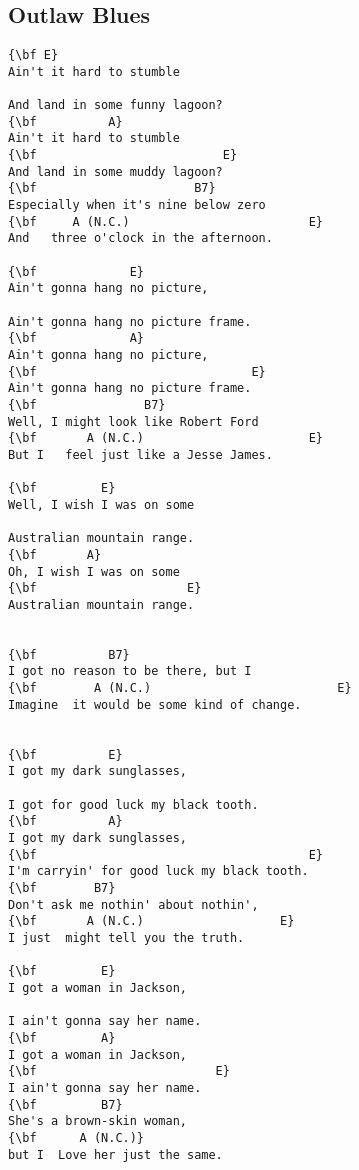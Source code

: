 \documentclass[a4paper]{article}
\begin{document}
\subsection{Outlaw Blues} %
\label{sub:Outlaw Blues}
\begin{multicols}{2}
\begin{Verbatim}[commandchars=\\\{\}]
{\bf E}
Ain't it hard to stumble

And land in some funny lagoon?
{\bf          A}
Ain't it hard to stumble
{\bf                          E}
And land in some muddy lagoon?
{\bf                      B7}
Especially when it's nine below zero
{\bf     A (N.C.)                         E}
And   three o'clock in the afternoon.

{\bf             E}
Ain't gonna hang no picture,

Ain't gonna hang no picture frame.
{\bf             A}
Ain't gonna hang no picture,
{\bf                              E}
Ain't gonna hang no picture frame.
{\bf               B7}
Well, I might look like Robert Ford
{\bf       A (N.C.)                       E}
But I   feel just like a Jesse James.

{\bf         E}
Well, I wish I was on some

Australian mountain range.
{\bf       A}
Oh, I wish I was on some
{\bf                     E}
Australian mountain range.


{\bf          B7}
I got no reason to be there, but I
{\bf        A (N.C.)                          E}
Imagine  it would be some kind of change.


{\bf          E}
I got my dark sunglasses,

I got for good luck my black tooth.
{\bf          A}
I got my dark sunglasses,
{\bf                                      E}
I'm carryin' for good luck my black tooth.
{\bf        B7}
Don't ask me nothin' about nothin',
{\bf       A (N.C.)                   E}
I just  might tell you the truth.

{\bf         E}
I got a woman in Jackson,

I ain't gonna say her name.
{\bf         A}
I got a woman in Jackson,
{\bf                         E}
I ain't gonna say her name.
{\bf         B7}
She's a brown-skin woman,
{\bf      A (N.C.)}
but I  Love her just the same.
\end{Verbatim}
\end{multicols}
\newpage
\end{document}
